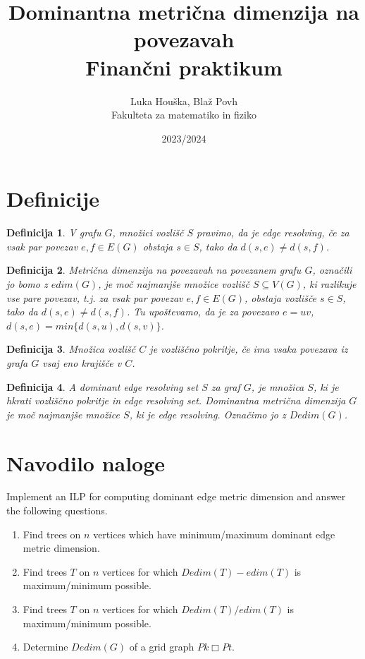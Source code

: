 \documentclass[a4paper,12pt]{article}
\title{Dominantna metrična dimenzija na povezavah \\ 
\Large Finančni praktikum}
\author{Luka Houška, Blaž Povh \\
Fakulteta za matematiko in fiziko}
\date{2023/2024}
\newtheorem{definicija}{Definicija}
\begin{document}
\maketitle

\section{Definicije}
    \begin{definicija}
        V grafu $G$, množici vozlišč $S$ pravimo, da je edge resolving, če za vsak par povezav $e, f \in E(G)$ obstaja $s \in S$, tako da $d(s, e) \neq  d(s, f)$.
    \end{definicija}

    \begin{definicija}
        Metrična dimenzija na povezavah na  povezanem grafu $G$, označili jo bomo z $edim(G)$, je moč najmanjše množice vozlišč $S\subseteq V(G)$, ki razlikuje vse pare povezav, t.j. za vsak par povezav $e, f \in E(G)$, obstaja vozlišče $s \in S$, tako da $d(s, e) \neq d(s, f )$. Tu upoštevamo, da je za povezavo $e=uv$, $d(s, e) = min\{d(s, u), d(s, v)\}$.
    \end{definicija}
        
    \begin{definicija}
        Množica vozlišč $C$ je \emph{vozliščno pokritje}, če ima vsaka povezava iz grafa $G$ vsaj eno krajišče v $C$.
    \end{definicija}

    \begin{definicija}
        A dominant edge resolving set $S$ za graf $G$, je množica $S$, ki je hkrati vozliščno pokritje in edge resolving set. Dominantna metrična dimenzija $G$ je moč najmanjše množice $S$, ki je edge resolving. Označimo jo z $Dedim(G)$.
    \end{definicija}

\section{Navodilo naloge}
    Implement an ILP for computing dominant edge metric dimension and answer the following questions.
    \begin{enumerate}
        \item Find trees on $n$ vertices which have minimum/maximum dominant edge metric dimension.
        \item Find trees $T$ on $n$ vertices for which $Dedim(T) - edim(T)$ is maximum/minimum possible.
        \item Find trees $T$ on $n$ vertices for which $Dedim(T)/ edim(T)$ is maximum/minimum possible.
        \item Determine $Dedim(G)$ of a grid graph $Pk \Box Pt$.
    \end{enumerate}
\end{document}
